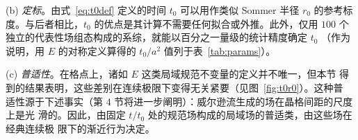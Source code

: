 \vspace{0.5ex}
\noindent
(b) \textit{定标}。由式~\eqref{eq:t0def} 定义的时间 $t_0$
可以用作类似 Sommer 半径 $r_0$ 的参考标度。与后者相比，$t_0$
的优点是其计算不需要任何拟合或外推。此外，仅用 $100$
个独立的代表性场组态构成的系综，就能以百分之一量级的统计精度确定 $t_0$
（作为说明，用 $E$ 的对称定义算得的 $t_0/a^2$ 值列于表~\ref{tab:params}）。

\vspace{0.5ex}
\noindent
(c) \textit{普适性}。在格点上，诸如 $E$ 这类局域规范不变量的定义并不唯一，但本节
得到的结果表明，这些差别在连续极限下变得无关紧要（见图~\ref{fig:t0r0}）。这种普
适性源于下述事实（第 4 节将进一步阐明）：威尔逊流生成的场在晶格间距的尺度上是光
滑的。因此，由固定 $t/t_0$ 处的规范场构成的局域场的普适类，由这些场在经典连续极
限下的渐近行为决定。



